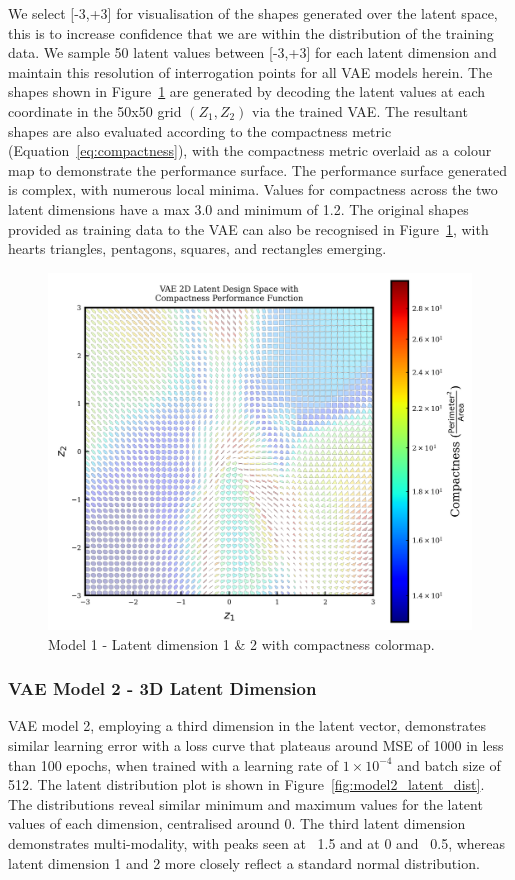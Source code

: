 \documentclass{article}
\begin{document}
We select [-3,+3] for visualisation of the shapes generated over the latent space, this is to increase confidence that we are within the distribution of the training data. We sample 50 latent values between [-3,+3] for each latent dimension and maintain this resolution of interrogation points for all VAE models herein. The shapes shown in Figure~\ref{fig:model1_latent_visualisation} are generated by decoding the latent values at each coordinate in the 50x50 grid $(Z_1,Z_2)$ via the trained VAE. The resultant shapes are also evaluated according to the compactness metric (Equation~\eqref{eq:compactness}), with the compactness metric overlaid as a colour map to demonstrate the performance surface. The performance surface generated is complex, with numerous local minima. Values for compactness across the two latent dimensions have a max 3.0 and minimum of 1.2. The original shapes provided as training data to the VAE can also be recognised in Figure~\ref{fig:model1_latent_visualisation}, with hearts triangles, pentagons, squares, and rectangles emerging.

\begin{figure}[H]
    \centering
    \includegraphics[width=0.75\linewidth]{figures/VAEmodels/model1/latent_vis_1000epochs.png}
    \caption{Model 1 - Latent dimension 1 \& 2 with compactness colormap.}
    \label{fig:model1_latent_visualisation}
\end{figure}

\subsubsection{VAE Model 2 - 3D Latent Dimension}
VAE model 2, employing a third dimension in the latent vector, demonstrates similar learning error with a loss curve that plateaus around MSE of 1000 in less than 100 epochs, when trained with a learning rate of $1\times10^{-4}$ and batch size of 512. The latent distribution plot is shown in Figure~\ref{fig:model2_latent_dist}. The distributions reveal similar minimum and maximum values for the latent values of each dimension, centralised around 0. The third latent dimension demonstrates multi-modality, with peaks seen at ~1.5 and at 0 and ~0.5, whereas latent dimension 1 and 2 more closely reflect a standard normal distribution.
\end{document}
